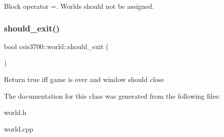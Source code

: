 Block operator =. Worlds should not be assigned. \mbox{\label{classcsis3700_1_1world_a72b6c90fa52ae434dc866f40caf5ee07}} 
\subsubsection{\texorpdfstring{should\+\_\+exit()}{should\_exit()}}
{\footnotesize\ttfamily bool csis3700\+::world\+::should\+\_\+exit (\begin{DoxyParamCaption}{ }\end{DoxyParamCaption})}

Return true iff game is over and window should close 

The documentation for this class was generated from the following files\+:\begin{DoxyCompactItemize}
\item 
world.\+h\item 
world.\+cpp\end{DoxyCompactItemize}
